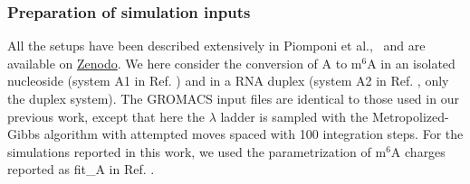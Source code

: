 \documentclass[journal=jacsat,manuscript=article]{achemso}
\begin{document}
\subsubsection{Preparation of simulation inputs}
All the setups have been described extensively in Piomponi et al.,~\cite{piomponi2022molecular} and are available on  \href{https://zenodo.org/record/6498021}{Zenodo}. We here consider the conversion of A to m$^6$A in an isolated nucleoside (system A1 in Ref. \cite{piomponi2022molecular}) and in a RNA duplex (system A2 in Ref. \cite{piomponi2022molecular}, only the duplex system). The GROMACS input files are identical to those used in our previous work, except that here the $\lambda$ ladder is sampled with the Metropolized-Gibbs algorithm with attempted moves spaced with 100 integration steps. For the simulations reported in this work, we used the parametrization of m$^6$A charges reported as fit\_A in Ref. \cite{piomponi2022molecular}.
\end{document}
